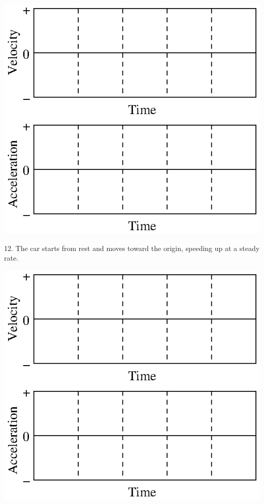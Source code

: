 \vspace{0.3cm}
{\par\centering \includegraphics{slowing/slowing_fig15.eps} \par}
\vspace{0.3cm}

12. The car starts from rest and moves toward the origin, speeding up at a steady
rate.

\vspace{0.3cm}
{\par\centering \includegraphics{slowing/slowing_fig15.eps} \par}
\vspace{0.3cm}

